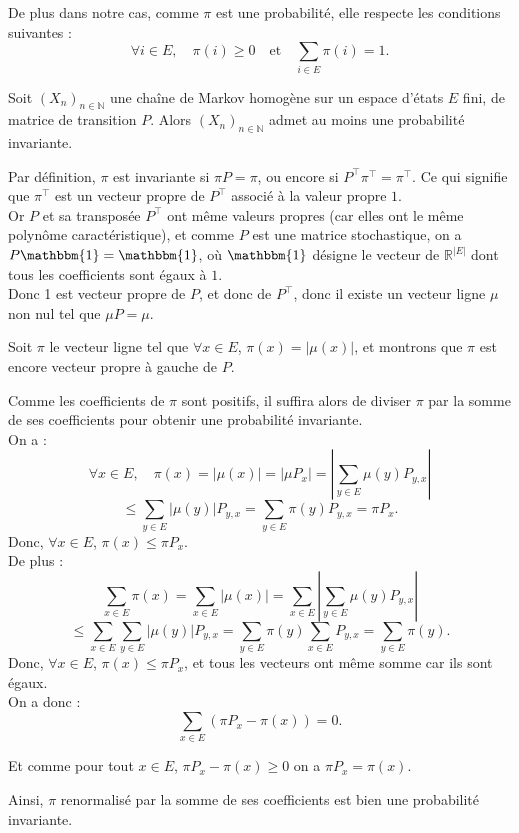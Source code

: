 \documentclass{article}
\begin{document}
De plus dans notre cas, comme $\pi$ est une probabilité, elle respecte les conditions suivantes :
\[
\forall i \in E, \quad \pi(i) \geq 0 \quad \text{et} \quad \sum_{i \in E} \pi(i) = 1.
\]

\begin{tcolorbox}[colback=white,colframe=blue!80!black,title=Existence d'une probabilité invariante]
Soit $(X_n)_{n \in \mathbb{N}}$ une chaîne de Markov homogène sur un espace d'états $E$ fini, de matrice de transition $P$. Alors $(X_n)_{n \in \mathbb{N}}$ admet au moins une probabilité invariante.
\end{tcolorbox}

\begin{tcolorbox}[colback=white,colframe=green!80!black,title=Démonstration, breakable]

Par définition, $\pi$ est invariante si $\pi P = \pi$, ou encore si $P^{\top} \pi^{\top} = \pi^{\top}$. Ce qui signifie que $\pi^{\top}$ est un vecteur propre de $P^{\top}$ associé à la valeur propre $1$. \\

Or $P$ et sa transposée $P^{\top}$ ont même valeurs propres (car elles ont le même polynôme caractéristique), et comme $P$ est une matrice stochastique, on a $P \mathbbm{1} = \mathbbm{1}$, où $\mathbbm{1}$ désigne le vecteur de $\mathbb{R}^{|E|}$ dont tous les coefficients sont égaux à $1$. \\

Donc 1 est vecteur propre de $P$, et donc de $P^{\top}$, donc il existe un vecteur ligne $\mu$ non nul tel que $\mu P = \mu$.

Soit $\pi$ le vecteur ligne tel que $\forall x \in E$, $\pi(x) = |\mu(x)|$, et montrons que $\pi$ est encore vecteur propre à gauche de $P$.

Comme les coefficients de $\pi$ sont positifs, il suffira alors de diviser $\pi$ par la somme de ses coefficients pour obtenir une probabilité invariante. \\

On a :
\[
\forall x \in E, \quad \pi(x) = |\mu(x)| = |\mu P_x| = \left| \sum_{y \in E} \mu(y) P_{y,x} \right|
\]
\[
\leq \sum_{y \in E} |\mu(y)| P_{y,x} = \sum_{y \in E} \pi(y) P_{y,x} = \pi P_x.
\]
Donc, $\forall x \in E$, $\pi(x) \leq \pi P_x$. \\

De plus :
\[
\sum_{x \in E} \pi(x) = \sum_{x \in E} |\mu(x)| = \sum_{x \in E} \left| \sum_{y \in E} \mu(y) P_{y,x} \right|
\]
\[
\leq \sum_{x \in E} \sum_{y \in E} |\mu(y)| P_{y,x} = \sum_{y \in E} \pi(y) \sum_{x \in E} P_{y,x} = \sum_{y \in E} \pi(y).
\]
Donc, $\forall x \in E$, $\pi(x) \leq \pi P_x$, et tous les vecteurs ont même somme car ils sont égaux. \\

On a donc :
\[
\sum_{x \in E} (\pi P_x - \pi(x)) = 0.
\]

Et comme pour tout $x \in E$, $\pi P_x - \pi(x) \geq 0$ on a $\pi P_x = \pi(x)$.

Ainsi, $\pi$ renormalisé par la somme de ses coefficients est bien une probabilité invariante.
\end{tcolorbox}
\end{document}
